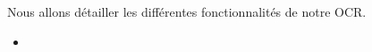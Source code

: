 Nous allons détailler les différentes fonctionnalités de notre OCR.
\begin{itemize}
  \item{}
\end{itemize}

